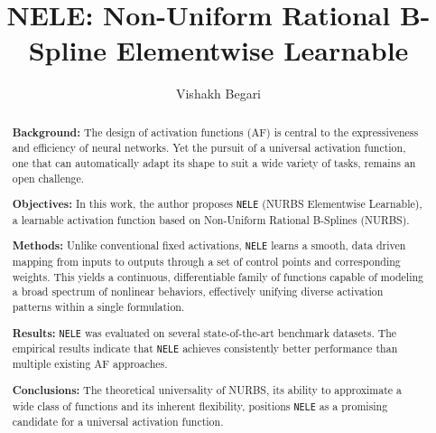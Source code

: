 \documentclass[manuscript, screen, review]{jair}
\begin{document}
\title[NELE]{NELE: Non-Uniform Rational B-Spline Elementwise Learnable}

\author{Vishakh Begari}

\renewcommand{\shortauthors}{Begari}

\begin{abstract}
{\bf Background:} 
    The design of activation functions (AF) 
    is central to the expressiveness and efficiency of neural networks. 
    Yet the pursuit of a universal activation function, one that can 
    automatically adapt its shape to suit a wide variety of tasks, remains 
    an open challenge.  
    
    {\bf Objectives:}
    In this work, the author proposes \texttt{NELE} (NURBS Elementwise Learnable), 
    a learnable activation function based on Non-Uniform Rational B-Splines (NURBS).

    {\bf Methods:}
    Unlike conventional fixed activations, \texttt{NELE} 
    learns a smooth, data driven mapping from inputs to outputs 
    through a set of control points and corresponding weights.
    This yields a continuous, differentiable family of functions capable 
    of modeling a broad spectrum of nonlinear behaviors, effectively 
    unifying diverse activation patterns within a single formulation.

    {\bf Results:}
    \texttt{NELE} was evaluated on several state-of-the-art benchmark datasets.
    The empirical results indicate that \texttt{NELE} achieves consistently better performance 
    than multiple existing AF approaches.

    {\bf Conclusions:}
    The theoretical universality of NURBS, its ability to approximate a wide class 
    of functions and its inherent flexibility, positions \texttt{NELE} as a promising candidate 
    for a universal activation function.
\end{abstract}
\end{document}
